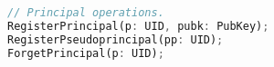 \begin{figure}[t]
\begin{lstlisting}[language=Rust, style=rust]
// Principal operations.
RegisterPrincipal(p: UID, pubk: PubKey);
RegisterPseudoprincipal(pp: UID);
ForgetPrincipal(p: UID);


\end{lstlisting}
\end{figure}
